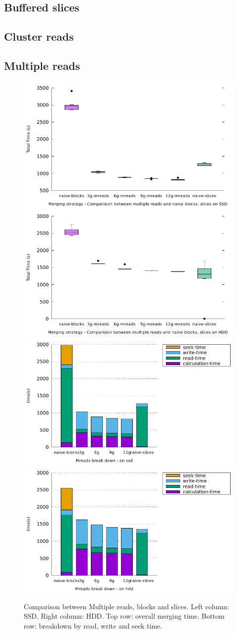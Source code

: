 \documentclass[10pt, conference, compsocconf]{IEEEtran}
\begin{document}
\subsection{Buffered slices}

\subsection{Cluster reads}

\subsection{Multiple reads}

\begin{figure}[h]
  \centering
  \includegraphics[width=0.45\columnwidth]{figures/benchmark-mreads/mreads-comparision-ssd.pdf}
  \hfill
  \includegraphics[width=0.45\columnwidth]{figures/benchmark-mreads/mreads-comparision-hdd.pdf}\\
  \includegraphics[width=0.45\columnwidth]{figures/benchmark-mreads/mreads-breakdown-ssd.pdf}
  \hfill
    \includegraphics[width=0.45\columnwidth]{figures/benchmark-mreads/mreads-breakdown-hdd.pdf}
  \caption{Comparison between Multiple reads, blocks and slices. Left column: SSD. Right column: HDD. Top row: overall merging time. Bottom row: breakdown by read, write and seek time.}
\label{fig:multiple-reads}
\end{figure}
\end{document}
